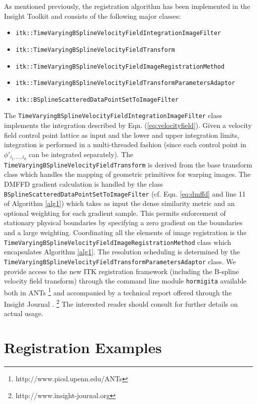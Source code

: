 \documentclass{llncs}
\begin{document}
As mentioned previously, the registration algorithm has been implemented in the
Insight Toolkit and consists of the following major classes: 
\begin{itemize}
  \item \verb#itk::TimeVaryingBSplineVelocityFieldIntegrationImageFilter#
  \item \verb#itk::TimeVaryingBSplineVelocityFieldTransform#
  \item \verb#itk::TimeVaryingBSplineVelocityFieldImageRegistrationMethod#
  \item \verb#itk::TimeVaryingBSplineVelocityFieldTransformParametersAdaptor#
  \item \verb#itk::BSplineScatteredDataPointSetToImageFilter#
\end{itemize}
The \verb#TimeVaryingBSplineVelocityFieldIntegrationImageFilter# class implements
the integration described by Eqn. (\ref{eq:velocityfield}).  Given a 
velocity field control point lattice as 
input and the lower and upper integration limits, integration is performed 
in a multi-threaded fashion (since each control point in $\phi'_{i_1,\ldots,i_d}$
can be integrated separately).  The \verb#TimeVaryingBSplineVelocityFieldTransform# 
is derived from the base transform class which handles the mapping of geometric primitives
for warping images.  The DMFFD gradient calculation  is handled by the class \verb#BSplineScatteredDataPointSetToImageFilter# (cf. Eqn. \ref{eq:dmffd} and line 11
of Algorithm \ref{alg1}) which takes as input the dense similarity metric and an optional
weighting for each gradient sample.  This permits enforcement of stationary physical
boundaries by specifying a zero gradient on the boundaries and a large weighting.
Coordinating all the elements of image registration is the
\verb#TimeVaryingBSplineVelocityFieldImageRegistrationMethod# class which
encapsulates Algorithm \ref{alg1}.  The resolution scheduling is determined
by the \verb#TimeVaryingBSplineVelocityFieldTransformParametersAdaptor# class.
We provide access to the new ITK 
registration framework (including the B-spline velocity field transform) 
through the command line module \verb#hormigita# available both in ANTs%
\footnote{
http://www.picsl.upenn.edu/ANTs
}
and accompanied by a technical report offered through the Insight Journal
\cite{tustison2012}.%
\footnote{
http://www.insight-journal.org
}
The interested reader should consult \cite{tustison2012} for further details on 
actual usage.

\section{Registration Examples}
\end{document}

